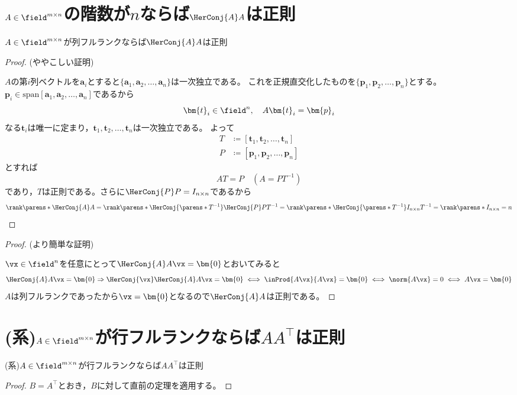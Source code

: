     \section{\texorpdfstring{$A\in\field^{m\times n}$}{A∈F\string^(m×n)}の階数が\texorpdfstring{$n$}{n}ならば\texorpdfstring{$\HerConj{A} A$}{A\string^*A}は正則}
        \label{列フルランク行列を掛けあわせて正則行列を作る}
        \begin{shadebox}
            $A\in\field^{m\times n}$が列フルランクならば$\HerConj{A} A$は正則
        \end{shadebox}
        \begin{proof}(ややこしい証明)
            \par
            $A$の第$i$列ベクトルを$\bm{a}_i$とすると$\{\bm{a}_1,\bm{a}_2,\dotsc,\bm{a}_n\}$は一次独立である。
            これを正規直交化したものを$\{\bm{p}_1,\bm{p}_2,\dotsc,\bm{p}_n\}$とする。
            $\bm{p}_i\in\mathrm{span}[\bm{a}_1,\bm{a}_2,\dotsc,\bm{a}_n]$であるから
            \[\bm{t}_i\in\field^n,\quad A\bm{t}_i=\bm{p}_i\]
            なる$\bm{t}_i$は唯一に定まり，$\bm{t}_1,\bm{t}_2,\dotsc,\bm{t}_n$は一次独立である。
            よって
            \begin{align*}
                T &\coloneq [\bm{t}_1,\bm{t}_2,\dotsc,\bm{t}_n]\\
                P &\coloneq [\bm{p}_1,\bm{p}_2,\dotsc,\bm{p}_n]
            \end{align*}
            とすれば
            \[AT = P\quad(A = PT^{-1})\]
            であり，$T$は正則である。さらに$\HerConj{P} P = I_{n\times n}$であるから
            \[\rank\parens*{\HerConj{A} A} = \rank\parens*{\HerConj{\parens*{T^{-1}}} \HerConj{P} PT^{-1}} = \rank\parens*{\HerConj{\parens*{T^{-1}}} I_{n\times n}T^{-1}} = \rank\parens*{I_{n\times n}} = n\]
        \end{proof}
        \begin{proof}
            (より簡単な証明)
            \par
            $\vx\in\field^n$を任意にとって$\HerConj{A} A\vx=\bm{0}$とおいてみると
            \[\HerConj{A} A\vx=\bm{0} \Rightarrow \HerConj{\vx} \HerConj{A} A\vx=\bm{0} \iff \inProd{A\vx}{A\vx}=\bm{0} \iff \norm{A\vx}=0 \iff A\vx=\bm{0}\]
            $A$は列フルランクであったから$\vx=\bm{0}$となるので$\HerConj{A} A$は正則である。
        \end{proof}
    \section{(系)\texorpdfstring{\quad$A\in\field^{m\times n}$}{A∈F\string^(m×n)}が行フルランクならば\texorpdfstring{$AA^\top$}{AA\string^⊤}は正則}
        \begin{shadebox}
            (系)\quad$A\in\field^{m\times n}$が行フルランクならば$AA^\top$は正則
        \end{shadebox}
        \begin{proof}
            $B=A^\top$とおき，$B$に対して直前の定理を適用する。
        \end{proof}
